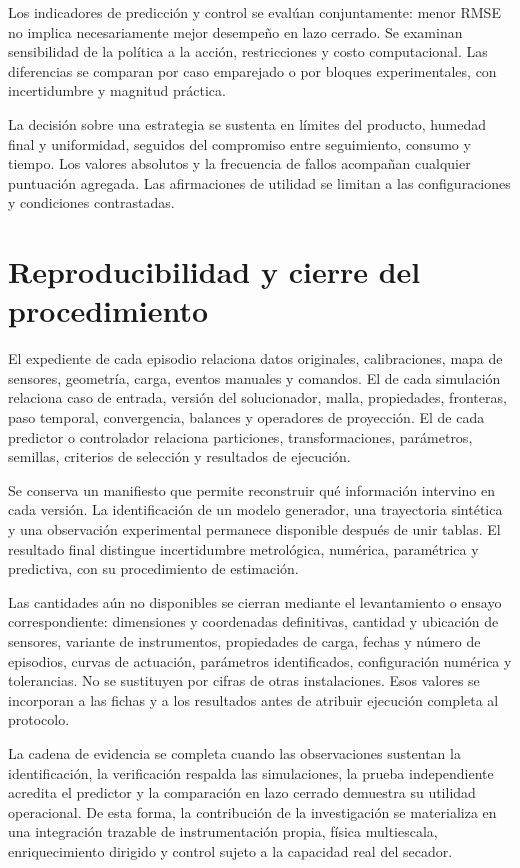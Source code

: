 Los indicadores de predicción y control se evalúan conjuntamente: menor RMSE no implica necesariamente mejor desempeño en lazo cerrado. Se examinan sensibilidad de la política a la acción, restricciones y costo computacional. Las diferencias se comparan por caso emparejado o por bloques experimentales, con incertidumbre y magnitud práctica.

La decisión sobre una estrategia se sustenta en límites del producto, humedad final y uniformidad, seguidos del compromiso entre seguimiento, consumo y tiempo. Los valores absolutos y la frecuencia de fallos acompañan cualquier puntuación agregada. Las afirmaciones de utilidad se limitan a las configuraciones y condiciones contrastadas.

\section{Reproducibilidad y cierre del procedimiento}
\label{met:reproducibilidad}

El expediente de cada episodio relaciona datos originales, calibraciones, mapa de sensores, geometría, carga, eventos manuales y comandos. El de cada simulación relaciona caso de entrada, versión del solucionador, malla, propiedades, fronteras, paso temporal, convergencia, balances y operadores de proyección. El de cada predictor o controlador relaciona particiones, transformaciones, parámetros, semillas, criterios de selección y resultados de ejecución.

Se conserva un manifiesto que permite reconstruir qué información intervino en cada versión. La identificación de un modelo generador, una trayectoria sintética y una observación experimental permanece disponible después de unir tablas. El resultado final distingue incertidumbre metrológica, numérica, paramétrica y predictiva, con su procedimiento de estimación.

Las cantidades aún no disponibles se cierran mediante el levantamiento o ensayo correspondiente: dimensiones y coordenadas definitivas, cantidad y ubicación de sensores, variante de instrumentos, propiedades de carga, fechas y número de episodios, curvas de actuación, parámetros identificados, configuración numérica y tolerancias. No se sustituyen por cifras de otras instalaciones. Esos valores se incorporan a las fichas y a los resultados antes de atribuir ejecución completa al protocolo.

La cadena de evidencia se completa cuando las observaciones sustentan la identificación, la verificación respalda las simulaciones, la prueba independiente acredita el predictor y la comparación en lazo cerrado demuestra su utilidad operacional. De esta forma, la contribución de la investigación se materializa en una integración trazable de instrumentación propia, física multiescala, enriquecimiento dirigido y control sujeto a la capacidad real del secador.
